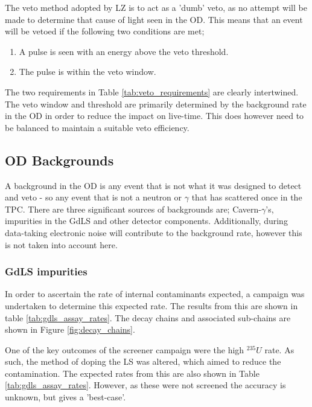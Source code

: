 \par
The veto method adopted by LZ is to act as a 'dumb' veto, as no attempt will be made to determine that cause of light seen in the OD.
This means that an event will be vetoed if the following two conditions are met;
\begin{enumerate}
    \item A pulse is seen with an energy above the veto threshold.
    \item The pulse is within the veto window.
\end{enumerate}
The two requirements in Table \ref{tab:veto_requirements} are clearly intertwined.
The veto window and threshold are primarily determined by the background rate in the OD in order to reduce the impact on live-time.
This does however need to be balanced to maintain a suitable veto efficiency.

\subsection{OD Backgrounds}
\par
A background in the OD is any event that is not what it was designed to detect and veto - so any event that is not a neutron or $\gamma$ that has scattered once in the TPC.
There are three significant sources of backgrounds are; Cavern-$\gamma$'s, impurities in the GdLS and other detector components.
Additionally, during data-taking electronic noise will contribute to the background rate, however this is not taken into account here. 

\subsubsection{GdLS impurities}
\par
In order to ascertain the rate of internal contaminants expected, a campaign was undertaken \cite{scotthaselschwardt_thesis_ref} to determine this expected rate.
The results from this are shown in table \ref{tab:gdls_assay_rates}.
The decay chains and associated sub-chains are shown in Figure \ref{fig:decay_chains}.

\par
One of the key outcomes of the screener campaign were the high ${}^{235}U$ rate.
As such, the method of doping the LS was altered, which aimed to reduce the contamination.
The expected rates from this are also shown in Table \ref{tab:gdls_assay_rates}.
However, as these were not screened the accuracy is unknown, but gives a 'best-case'.



